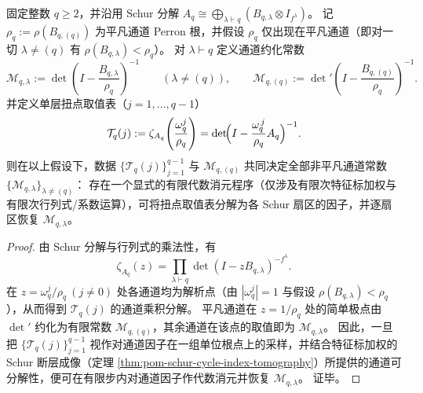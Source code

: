 \begin{theorem}\label{thm:pom-torsion-schur-dual-microscope}
固定整数 \(q\ge2\)，并沿用 Schur 分解
\(
A_q\cong\bigoplus_{\lambda\vdash q}(B_{q,\lambda}\otimes I_{f^\lambda})
\)。
记 \(\rho_q:=\rho(B_{q,(q)})\) 为平凡通道 Perron 根，并假设 \(\rho_q\) 仅出现在平凡通道（即对一切 \(\lambda\neq(q)\) 有 \(\rho(B_{q,\lambda})<\rho_q\)）。
对 \(\lambda\vdash q\) 定义通道约化常数
\[
\mathcal{M}_{q,\lambda}
:=
\det\!\left(I-\frac{B_{q,\lambda}}{\rho_q}\right)^{-1}\qquad(\lambda\neq(q)),
\qquad
\mathcal{M}_{q,(q)}
:=
\det\nolimits'\!\left(I-\frac{B_{q,(q)}}{\rho_q}\right)^{-1}.
\]
并定义单层扭点取值表（\(j=1,\dots,q-1\)）
\[
\mathcal{T}_q(j)
:=
\zeta_{A_q}\!\left(\frac{\omega_q^j}{\rho_q}\right)
=
\det\!\Bigl(I-\frac{\omega_q^{\,j}}{\rho_q}A_q\Bigr)^{-1}.
\]
则在以上假设下，数据 \(\{\mathcal{T}_q(j)\}_{j=1}^{q-1}\) 与 \(\mathcal{M}_{q,(q)}\) 共同决定全部非平凡通道常数 \(\{\mathcal{M}_{q,\lambda}\}_{\lambda\neq(q)}\)：
存在一个显式的有限代数消元程序（仅涉及有限次特征标加权与有限次行列式/系数运算），可将扭点取值表分解为各 Schur 扇区的因子，并逐扇区恢复 \(\mathcal{M}_{q,\lambda}\)。
\end{theorem}
\begin{proof}
由 Schur 分解与行列式的乘法性，有
\[
\zeta_{A_q}(z)
=\prod_{\lambda\vdash q}\det(I-zB_{q,\lambda})^{-f^\lambda}.
\]
在 \(z=\omega_q^j/\rho_q\ (j\neq0)\) 处各通道均为解析点（由 \(|\omega_q^j|=1\) 与假设 \(\rho(B_{q,\lambda})<\rho_q\)），从而得到 \(\mathcal{T}_q(j)\) 的通道乘积分解。
平凡通道在 \(z=1/\rho_q\) 处的简单极点由 \(\det'\) 约化为有限常数 \(\mathcal{M}_{q,(q)}\)，其余通道在该点的取值即为 \(\mathcal{M}_{q,\lambda}\)。
因此，一旦把 \(\{\mathcal{T}_q(j)\}_{j=1}^{q-1}\) 视作对通道因子在一组单位根点上的采样，并结合特征标加权的 Schur 断层成像（定理 \ref{thm:pom-schur-cycle-index-tomography}）所提供的通道可分解性，便可在有限步内对通道因子作代数消元并恢复 \(\mathcal{M}_{q,\lambda}\)。
证毕。
\end{proof}

